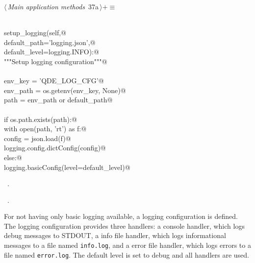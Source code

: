 \documentclass[
    a4paper,      %
    10pt,         %
    openright,    %
    notitlepage,  %
    parskip=half, %
]{scrreprt}       %
\theoremstyle{definition}                    %
\begin{document}
\begin{flushleft} \small
\begin{minipage}{\linewidth}\label{scrap42}\raggedright\small
{} $\langle\,${\itshape Main application methods}\nobreak\ {\footnotesize {37a}}$\,\rangle+\equiv$
\vspace{-1ex}
\begin{list}{}{} \item
\mbox{}\lstinline@@\\
\mbox{}\lstinline@def setup_logging(self,@\\
\mbox{}\lstinline@                  default_path='logging.json',@\\
\mbox{}\lstinline@                  default_level=logging.INFO):@\\
\mbox{}\lstinline@    """Setup logging configuration"""@\\
\mbox{}\lstinline@@\\
\mbox{}\lstinline@    env_key  = 'QDE_LOG_CFG'@\\
\mbox{}\lstinline@    env_path = os.getenv(env_key, None)@\\
\mbox{}\lstinline@    path     = env_path or default_path@\\
\mbox{}\lstinline@@\\
\mbox{}\lstinline@    if os.path.exists(path):@\\
\mbox{}\lstinline@        with open(path, 'rt') as f:@\\
\mbox{}\lstinline@            config = json.load(f)@\\
\mbox{}\lstinline@            logging.config.dictConfig(config)@\\
\mbox{}\lstinline@    else:@\\
\mbox{}\lstinline@        logging.basicConfig(level=default_level)@\\
\mbox{}\lstinline@@{\NWsep}
\end{list}
\vspace{-1.5ex}
\footnotesize
\begin{list}{}{\setlength{\itemsep}{-\parsep}\setlength{\itemindent}{-\leftmargin}}
\item \NWtxtMacroDefBy\ .
\item \NWtxtMacroRefIn\ .

\item{}
\end{list}
\end{minipage}\vspace{4ex}
\end{flushleft}
For not having only basic logging available, a logging configuration is defined.
The logging configuration provides three handlers: a console handler, which logs
debug messages to STDOUT, a info file handler, which logs informational messages
to a file named \verb+info.log+, and a error file handler, which logs errors to
a file named \verb+error.log+. The default level is set to debug and all
handlers are used.
\end{document}
